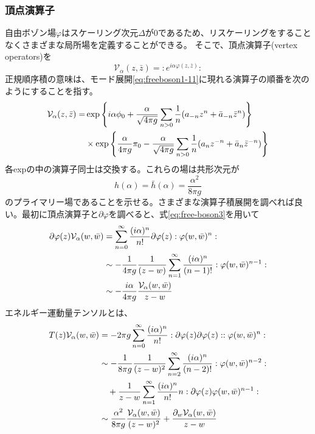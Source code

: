 \documentclass[11pt, aps, longbibliography]{article}
\numberwithin{equation}{section}
\begin{document}
        \subsubsection{頂点演算子}
        自由ボゾン場$\varphi$はスケーリング次元$\Delta$が0であるため、リスケーリングをすることなくさまざまな局所場を定義することができる。
        そこで、頂点演算子(vertex operators)を
        \begin{equation}\label{eq:freeboson2-1}
            \mathcal{V}_\alpha(z,\bar{z}) = :e^{i\alpha \varphi(z,\bar{z})}:
        \end{equation}
        正規順序積の意味は、モード展開\eqref{eq:freeboson1-11}に現れる演算子の順番を次のようにすることを指す。
        \begin{align}\label{eq:freeboson2-2}
            \mathcal{V}_\alpha(z,\bar{z}) = &\exp \left\{ i\alpha\phi_0 + \frac{\alpha}{\sqrt{4\pi g}} \sum_{n>0}\frac{1}{n}(a_{-n}z^n + \bar{a}_{-n}\bar{z}^n) \right\} \notag \\
            &\times  \exp \left\{ \frac{\alpha}{4\pi g}\pi_0 - \frac{\alpha}{\sqrt{4\pi g}} \sum_{n>0}\frac{1}{n}(a_{n}z^{-n} + \bar{a}_{n}\bar{z}^{-n}) \right\}
        \end{align}
        各expの中の演算子同士は交換する。これらの場は共形次元が
        \begin{equation}\label{eq:freeboson2-3}
            h(\alpha) = \bar{h}(\alpha) = \frac{\alpha^2}{8\pi g}
        \end{equation}
        のプライマリー場であることを示せる。さまざまな演算子積展開を調べれば良い。最初に頂点演算子と$\partial \varphi$を調べると、式\eqref{eq:free-boson3}を用いて
        \begin{align}\label{eq:freeboson2-4}
            \partial \varphi(z) \mathcal{V}_\alpha(w,\bar{w}) &= \sum_{n=0}^{\infty}\frac{(i\alpha)^n}{n!}\partial \varphi(z):\varphi(w,\bar{w})^n: \notag \\
            &\sim -\frac{1}{4\pi g}\frac{1}{(z-w)} \sum_{n=1}^{\infty} \frac{(i\alpha)^n}{(n-1)!}:\varphi(w,\bar{w})^{n-1}: \notag \\
            &\sim -\frac{i\alpha}{4\pi g}\frac{\mathcal{V}_\alpha(w,\bar{w})}{z-w}
        \end{align}
        エネルギー運動量テンソルとは、
        \begin{align}\label{eq:freeboson2-5}
            T(z)\mathcal{V}_\alpha(w,\bar{w}) &= -2\pi g\sum_{n=0}^{\infty}\frac{(i\alpha)^n}{n!}:\partial \varphi(z)\partial \varphi(z)::\varphi(w,\bar{w})^n: \notag \\
            &\sim -\frac{1}{8\pi g}\frac{1}{(z-w)^2}\sum_{n=2}^{\infty}\frac{(i\alpha)^n}{(n-2)!}:\varphi(w,\bar{w})^{n-2}: \notag \\
            &\quad + \frac{1}{z-w}\sum_{n=1}^{\infty}\frac{(i\alpha)^n}{n!}n:\partial \varphi(z)\varphi(w,\bar{w})^{n-1}: \notag \\
            &\sim \frac{\alpha^2}{8\pi g}\frac{\mathcal{V}_\alpha(w,\bar{w})}{(z-w)^2} + \frac{\partial_w\mathcal{V}_\alpha(w,\bar{w})}{z-w}
        \end{align}
\end{document}
